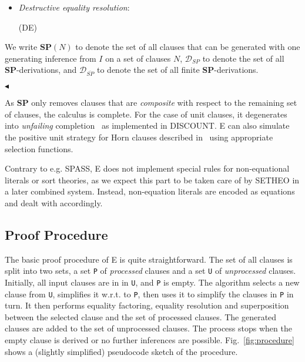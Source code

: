 \documentclass{article}
\begin{document}
\begin{definition}
\begin{itemize}
 \item \emph{Destructive equality resolution}:
   
   \bigskip (DE) 
   


 \end{itemize}
 We write $\mathbf{SP}(N)$ to denote the set of all clauses that can
 be generated with one generating inference from $I$ on a set of
 clauses $N$, $\mathcal{D}_{SP}$ to denote the set of all
 \textbf{SP}-derivations, and $\mathcal{D}_{\overline{SP}}$ to denote
  the set of all finite \textbf{SP}-derivations.
  
  \hfill$\blacktriangleleft$
\end{definition}



As \textbf{SP} only removes clauses that are \emph{composite} with
respect to the remaining set of clauses, the calculus is complete. For
the case of unit clauses, it degenerates into \emph{unfailing}
completion~\cite{BDP89} as implemented in DISCOUNT. E can also
simulate the positive unit strategy for Horn clauses described
in~\cite{Dershowitz:IJCAI-91} using appropriate selection functions.

Contrary to e.g. SPASS, E does not implement special
rules for non-equational literals or sort theories, as we expect this
part to be taken care of by SETHEO in a later combined system.
Instead, non-equation literals are encoded as equations and dealt with
accordingly.



\subsection{Proof Procedure}
\label{sec:procedure}


The basic proof procedure of E is quite straightforward. The set of
all clauses is split into two sets, a set \texttt{P} of
\emph{processed} clauses and a set \texttt{U} of \emph{unprocessed}
clauses. Initially, all input clauses are in in \texttt{U}, and
\texttt{P} is empty. The algorithm selects a new clause from
\texttt{U}, simplifies it w.r.t. to \texttt{P}, then uses it to
simplify the clauses in \texttt{P} in turn. It then performs equality
factoring, equality resolution and superposition between the selected
clause and the set of processed clauses. The generated clauses are
added to the set of unprocessed clauses. The process stops when the
empty clause is derived or no further inferences are possible.
Fig.~\ref{fig:procedure} shows a (slightly simplified) pseudocode
sketch of the procedure.
\end{document}
